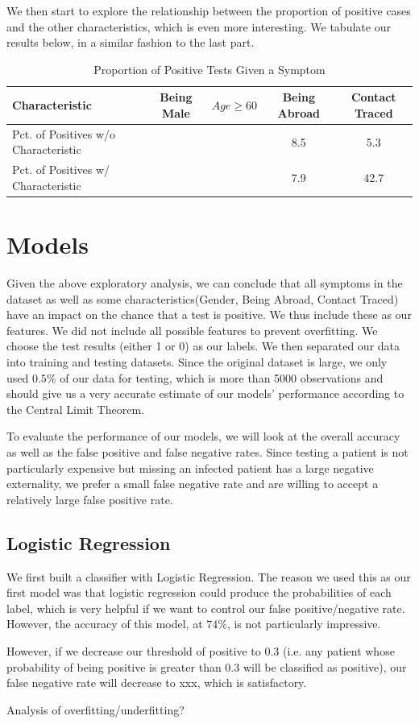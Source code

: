 \documentclass[a4paper]{article}
\begin{document}
We then start to explore the relationship between the proportion of positive cases and the other characteristics, which is even more interesting. We tabulate our results below, in a similar fashion to the last part.
\begin{table}[H]
\centering
\caption{Proportion of Positive Tests Given a Symptom}
\begin{tabular}{| l | c | c | c | c |}
\hline
Characteristic & Being Male & $Age \ge 60$ & Being Abroad & Contact Traced  \\ \hline
Pct. of Positives w/o Characteristic & & & 8.5 & 5.3 \\ \hline
Pct. of Positives w/ Characteristic & & & 7.9 & 42.7 \\
\hline
\end{tabular}
\label{Table}
\end{table}

\section*{Models}
Given the above exploratory analysis, we can conclude that all symptoms in the dataset as well as some characteristics(Gender, Being Abroad, Contact Traced) have an impact on the chance that a test is positive. We thus include these as our features. We did not include all possible features to prevent overfitting. We choose the test results (either 1 or 0) as our labels. We then separated our data into training and testing datasets. Since the original dataset is large, we only used $0.5\%$ of our data for testing, which is more than 5000 observations and should give us a very accurate estimate of our models' performance according to the Central Limit Theorem. \par
To evaluate the performance of our models, we will look at the overall accuracy as well as the false positive and false negative rates. Since testing a patient is not particularly expensive but missing an infected patient has a large negative externality, we prefer a small false negative rate and are willing to accept a relatively large false positive rate.

\subsection*{Logistic Regression}
We first built a classifier with Logistic Regression. The reason we used this as our first model was that logistic regression could produce the probabilities of each label, which is very helpful if we want to control our false positive/negative rate. However, the accuracy of this model, at $74\%$, is not particularly impressive.\par
However, if we decrease our threshold of positive to 0.3 (i.e. any patient whose probability of being positive is greater than 0.3 will be classified as positive), our false negative rate will decrease to xxx, which is satisfactory.\par
Analysis of overfitting/underfitting?
\end{document}
